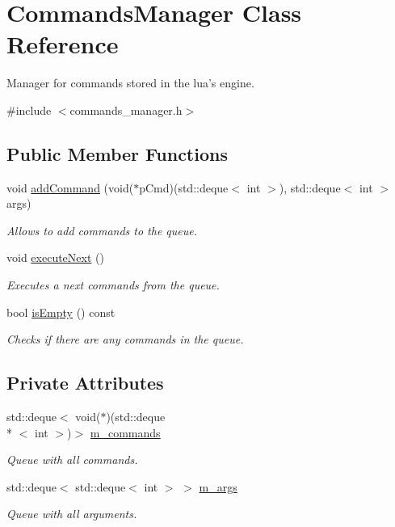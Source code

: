 \hypertarget{class_commands_manager}{\section{Commands\-Manager Class Reference}
\label{class_commands_manager}
}


Manager for commands stored in the lua's engine.  




{\ttfamily \#include $<$commands\-\_\-manager.\-h$>$}

\subsection*{Public Member Functions}
\begin{DoxyCompactItemize}
\item 
void \hyperlink{class_commands_manager_a1044e5df37dbb2b174dc9bc6a894d833}{add\-Command} (void($\ast$p\-Cmd)(std\-::deque$<$ int $>$), std\-::deque$<$ int $>$ args)
\begin{DoxyCompactList}\small\item\em Allows to add commands to the queue. \end{DoxyCompactList}\item 
void \hyperlink{class_commands_manager_a6de7776ecdf30cb6cf09d11213c0dd29}{execute\-Next} ()
\begin{DoxyCompactList}\small\item\em Executes a next commands from the queue. \end{DoxyCompactList}\item 
bool \hyperlink{class_commands_manager_a1fe3f32d1a8fed15559bc14acc74aceb}{is\-Empty} () const 
\begin{DoxyCompactList}\small\item\em Checks if there are any commands in the queue. \end{DoxyCompactList}\end{DoxyCompactItemize}
\subsection*{Private Attributes}
\begin{DoxyCompactItemize}
\item 
std\-::deque$<$ void($\ast$)(std\-::deque\\*
$<$ int $>$)$>$ \hyperlink{class_commands_manager_a99e904afc8d341f390efbd2c933c3321}{m\-\_\-commands}
\begin{DoxyCompactList}\small\item\em Queue with all commands. \end{DoxyCompactList}\item 
std\-::deque$<$ std\-::deque$<$ int $>$ $>$ \hyperlink{class_commands_manager_a47bce7001c94f824eb8b9acdccd7b1d5}{m\-\_\-args}
\begin{DoxyCompactList}\small\item\em Queue with all arguments. \end{DoxyCompactList}\end{DoxyCompactItemize}


